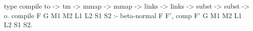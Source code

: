 type compile to -> tm -> mmap -> mmap ->  links -> links -> 
  subst -> subst -> o.
compile F G M1 M2 L1 L2 S1 S2 :-
  beta-normal F F', comp F' G M1 M2 L1 L2 S1 S2.
